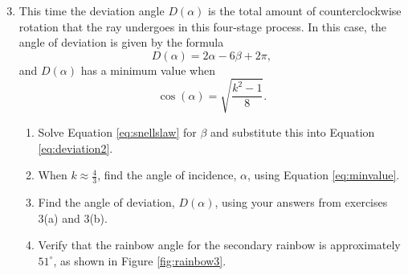\begin{enumerate}
\setcounter{enumi}{2}	
	\item This time the deviation angle $D(\alpha)$ is the total amount of counterclockwise rotation that the ray undergoes in this four-stage process. In this case, the angle of deviation is given by the formula
\begin{equation}
\label{eq:deviation2}
D(\alpha)=2\alpha-6\beta+2\pi,
\end{equation}
and $D(\alpha)$ has a minimum value when 
\begin{equation}
\label{eq:minvalue}
\cos(\alpha)=\sqrt{\dfrac{k^2-1}{8}}.
\end{equation} 

	\begin{enumerate}
	\item Solve Equation \eqref{eq:snellslaw} for $\beta$ and substitute this into Equation \eqref{eq:deviation2}. 
	\item When $k \approx \frac{4}{3}$, find the angle of incidence, $\alpha$, using Equation \eqref{eq:minvalue}.
	\item Find the angle of deviation, $D(\alpha)$, using your answers from exercises 3(a) and 3(b).
	\item Verify that the rainbow angle for the secondary rainbow is approximately $51^\circ$, as shown in Figure \ref{fig:rainbow3}.
	\end{enumerate}
\end{enumerate}
	

    
 
